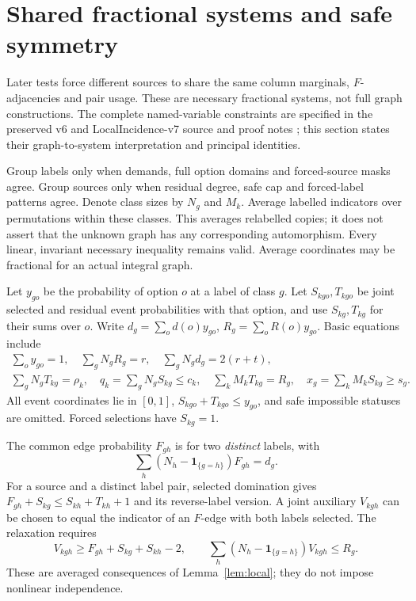 \documentclass[11pt,a4paper]{article}
\newcommand{\ind}[1]{\mathbf1_{\{#1\}}}\newcommand{\pos}[1]{[#1]_+}\newcommand{\floor}[1]{\left\lfloor#1\right\rfloor}\newcommand{\ceil}[1]{\left\lceil#1\right\rceil}
\begin{document}
\section{Shared fractional systems and safe symmetry}\label{sec:models}
Later tests force different sources to share the same column marginals, $F$-adjacencies and pair usage. These are necessary fractional systems, not full graph constructions. The complete named-variable constraints are specified in the preserved v6 and LocalIncidence-v7 source and proof notes \cite{v6,v7}; this section states their graph-to-system interpretation and principal identities.

Group labels only when demands, full option domains and forced-source masks agree. Group sources only when residual degree, safe cap and forced-label patterns agree. Denote class sizes by $N_g$ and $M_k$. Average labelled indicators over permutations within these classes. This averages relabelled copies; it does not assert that the unknown graph has any corresponding automorphism. Every linear, invariant necessary inequality remains valid. Average coordinates may be fractional for an actual integral graph.

Let $y_{go}$ be the probability of option $o$ at a label of class $g$. Let $S_{kgo},T_{kgo}$ be joint selected and residual event probabilities with that option, and use $S_{kg},T_{kg}$ for their sums over $o$. Write $d_g=\sum_od(o)y_{go}$, $R_g=\sum_oR(o)y_{go}$. Basic equations include
\begin{gather}
 \sum_o y_{go}=1,\quad \sum_gN_gR_g=r,\quad\sum_gN_gd_g=2(r+t),\label{eq:margins}\\
 \sum_gN_gT_{kg}=\rho_k,\quad q_k=\sum_gN_gS_{kg}\le c_k,\quad
 \sum_kM_kT_{kg}=R_g,\quad x_g=\sum_kM_kS_{kg}\ge s_g.\nonumber
\end{gather}
All event coordinates lie in $[0,1]$, $S_{kgo}+T_{kgo}\le y_{go}$, and safe impossible statuses are omitted. Forced selections have $S_{kg}=1$.

The common edge probability $F_{gh}$ is for two \emph{distinct} labels, with
\[
 \sum_h(N_h-\ind{g=h})F_{gh}=d_g.
\]
For a source and a distinct label pair, selected domination gives
$F_{gh}+S_{kg}\le S_{kh}+T_{kh}+1$ and its reverse-label version. A joint auxiliary $V_{kgh}$ can be chosen to equal the indicator of an $F$-edge with both labels selected. The relaxation requires
\[
 V_{kgh}\ge F_{gh}+S_{kg}+S_{kh}-2,\qquad
 \sum_h(N_h-\ind{g=h})V_{kgh}\le R_g.
\]
These are averaged consequences of Lemma~\ref{lem:local}; they do not impose nonlinear independence.
\end{document}

